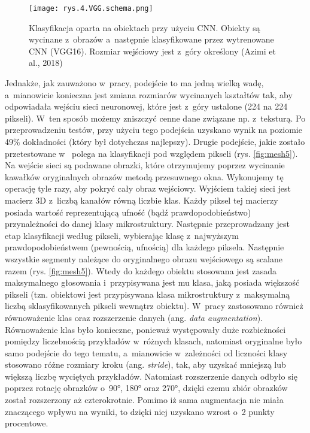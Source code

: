 \begin{figure}[h]
    \centering
    \texttt{[image: rys.4.VGG.schema.png]}
    \caption{Klasyfikacja oparta na obiektach przy użyciu CNN. Obiekty są wycinane z~obrazów a~następnie klasyfikowane przez wytrenowane CNN (VGG16). Rozmiar wejściowy jest z~góry określony (Azimi et al., 2018)}
    \label{fig:mesh4}
\end{figure}

\noindent Jednakże, jak zauważono w~pracy, podejście to ma jedną wielką wadę, a~mianowicie konieczna jest zmiana rozmiarów wycinanych kształtów tak, aby odpowiadała wejściu sieci neuronowej, które jest z~góry ustalone (224 na 224 pikseli). W~ten sposób możemy zniszczyć cenne dane związane np. z~teksturą. Po przeprowadzeniu testów, przy użyciu tego podejścia uzyskano wynik na poziomie 49\% dokładności (który był dotychczas najlepszy). Drugie podejście, jakie zostało przetestowane w~\cite{Azimi18} polega na klasyfikacji pod względem pikseli (rys. \ref{fig:mesh5}). Na wejście sieci są podawane obrazki, które otrzymujemy poprzez wycinanie kawałków oryginalnych obrazów metodą przesuwnego okna. Wykonujemy tę operację tyle razy, aby pokryć cały obraz wejściowy. Wyjściem takiej sieci jest macierz 3D z~liczbą kanałów równą liczbie klas. Każdy piksel tej macierzy posiada wartość reprezentującą ufność (bądź prawdopodobieństwo) przynależności do danej klasy mikrostruktury. Następnie przeprowadzany jest etap klasyfikacji według pikseli, wybierając klasę z~najwyższym prawdopodobieństwem (pewnością, ufnością) dla każdego piksela. Następnie wszystkie segmenty należące do oryginalnego obrazu wejściowego są scalane razem (rys. \ref{fig:mesh5}). Wtedy do każdego obiektu stosowana jest zasada maksymalnego głosowania i~przypisywana jest mu klasa, jaką posiada większość pikseli (tzn. obiektowi jest przypisywana klasa mikrostruktury z~maksymalną liczbą sklasyfikowanych pikseli wewnątrz obiektu). W~pracy zastosowano również równoważenie klas oraz rozszerzenie danych (ang. \textit{data augmentation}). Równoważenie klas było konieczne, ponieważ występowały duże rozbieżności pomiędzy liczebnością przykładów w~różnych klasach, natomiast oryginalne było samo podejście do tego tematu, a~mianowicie w~zależności od liczności klasy stosowano różne rozmiary kroku (ang. \textit{stride}), tak, aby uzyskać mniejszą lub większą liczbę wyciętych przykładów. Natomiast rozszerzenie danych odbyło się poprzez rotację obrazków o~90°, 180° oraz 270°, dzięki czemu zbiór obrazków został rozszerzony aż czterokrotnie. Pomimo iż sama augmentacja nie miała znaczącego wpływu na wyniki, to dzięki niej uzyskano wzrost o~2 punkty procentowe.
